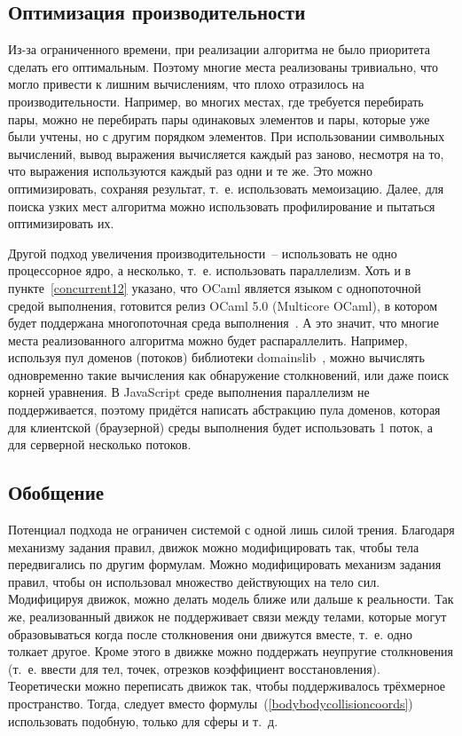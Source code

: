 \subsection{Оптимизация производительности}\label{optimization}

Из-за ограниченного времени, при реализации алгоритма не было приоритета сделать его оптимальным.
Поэтому многие места реализованы тривиально, что могло привести к лишним вычислениям, что плохо отразилось на производительности.
Например, во многих местах, где требуется перебирать пары,
можно не перебирать пары одинаковых элементов и пары, которые уже были учтены, но с другим порядком элементов.
При использовании символьных вычислений, вывод выражения вычисляется каждый раз заново, несмотря на то, что выражения используются каждый раз одни и те же.
Это можно оптимизировать, сохраняя результат, т.~е. использовать мемоизацию.
Далее, для поиска узких мест алгоритма можно использовать профилирование и пытаться оптимизировать их.

Другой подход увеличения производительности~-- использовать не одно процессорное ядро, а несколько, т.~е. использовать параллелизм.
Хоть и в пункте~\ref{concurrent12} указано, что OCaml является языком с однопоточной средой выполнения,
готовится релиз OCaml 5.0 (Multicore OCaml), в котором будет поддержана многопоточная среда выполнения~\cite{infoqmulticore}.
А это значит, что многие места реализованного алгоритма можно будет распараллелить.
Например, используя пул доменов (потоков) библиотеки domainslib~\cite{domainslibgithub},
можно вычислять одновременно такие вычисления как обнаружение столкновений, или даже поиск корней уравнения.
В JavaScript среде выполнения параллелизм не поддерживается, поэтому придётся написать абстракцию пула доменов,
которая для клиентской (браузерной) среды выполнения будет использовать 1 поток, а для серверной несколько потоков.

\subsection{Обобщение}

Потенциал подхода не ограничен системой с одной лишь силой трения.
Благодаря механизму задания правил, движок можно модифицировать так, чтобы тела передвигались по другим формулам.
Можно модифицировать механизм задания правил, чтобы он использовал множество действующих на тело сил.
Модифицируя движок, можно делать модель ближе или дальше к реальности.
Так же, реализованный движок не поддерживает связи между телами, которые
могут образовываться когда после столкновения они движутся вместе, т.~е. одно толкает другое.
Кроме этого в движке можно поддержать неупругие столкновения (т.~е. ввести для тел, точек, отрезков коэффициент восстановления).
Теоретически можно переписать движок так, чтобы поддерживалось трёхмерное пространство.
Тогда, следует вместо формулы~(\ref{bodybodycollisioncoords}) использовать подобную, только для сферы и т.~д.


